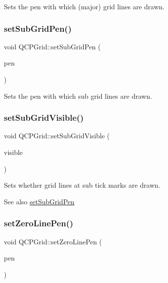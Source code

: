 Sets the pen with which (major) grid lines are drawn. \mbox{\label{class_q_c_p_grid_a9edd3593f384d1f0b0202a39cef4453d}} 
\subsubsection{\texorpdfstring{set\+Sub\+Grid\+Pen()}{setSubGridPen()}}
{\footnotesize\ttfamily void Q\+C\+P\+Grid\+::set\+Sub\+Grid\+Pen (\begin{DoxyParamCaption}\item[{const Q\+Pen \&}]{pen }\end{DoxyParamCaption})}

Sets the pen with which sub grid lines are drawn. \mbox{\label{class_q_c_p_grid_ad4ad6bf714ec45e08845456355a1b700}} 
\subsubsection{\texorpdfstring{set\+Sub\+Grid\+Visible()}{setSubGridVisible()}}
{\footnotesize\ttfamily void Q\+C\+P\+Grid\+::set\+Sub\+Grid\+Visible (\begin{DoxyParamCaption}\item[{bool}]{visible }\end{DoxyParamCaption})}

Sets whether grid lines at sub tick marks are drawn.

\begin{DoxySeeAlso}{See also}
\mbox{\hyperlink{class_q_c_p_grid_a9edd3593f384d1f0b0202a39cef4453d}{set\+Sub\+Grid\+Pen}} 
\end{DoxySeeAlso}
\mbox{\label{class_q_c_p_grid_a209f40fdb252397b418b82d3494d8ea0}} 
\subsubsection{\texorpdfstring{set\+Zero\+Line\+Pen()}{setZeroLinePen()}}
{\footnotesize\ttfamily void Q\+C\+P\+Grid\+::set\+Zero\+Line\+Pen (\begin{DoxyParamCaption}\item[{const Q\+Pen \&}]{pen }\end{DoxyParamCaption})}

